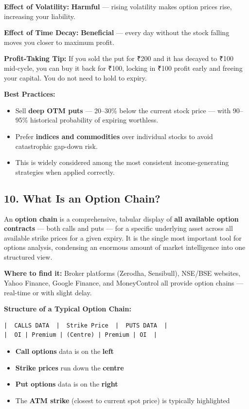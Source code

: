 \documentclass[12pt,openany]{book}
\begin{document}
\textbf{Effect of Volatility:} \textbf{Harmful} — rising volatility makes option prices rise, increasing your liability.

\textbf{Effect of Time Decay:} \textbf{Beneficial} — every day without the stock falling moves you closer to maximum profit.

\textbf{Profit-Taking Tip:} If you sold the put for ₹200 and it has decayed to ₹100 mid-cycle, you can buy it back for ₹100, locking in ₹100 profit early and freeing your capital. You do not need to hold to expiry.

\textbf{Best Practices:}
\begin{itemize}[leftmargin=*]
    \item Sell \textbf{deep OTM puts} — 20–30\% below the current stock price — with 90–95\% historical probability of expiring worthless.
    \item Prefer \textbf{indices and commodities} over individual stocks to avoid catastrophic gap-down risk.
    \item This is widely considered among the most consistent income-generating strategies when applied correctly.
\end{itemize}

\subsection{10. What Is an Option Chain?}

An \textbf{option chain} is a comprehensive, tabular display of \textbf{all available option contracts} — both calls and puts — for a specific underlying asset across all available strike prices for a given expiry. It is the single most important tool for options analysis, condensing an enormous amount of market intelligence into one structured view.

\textbf{Where to find it:} Broker platforms (Zerodha, Sensibull), NSE/BSE websites, Yahoo Finance, Google Finance, and MoneyControl all provide option chains — real-time or with slight delay.

\textbf{Structure of a Typical Option Chain:}

\begin{Verbatim}[breaklines=true,fontsize=\small]
|  CALLS DATA  |  Strike Price  |  PUTS DATA  |
|  OI | Premium | (Centre) | Premium | OI  |
\end{Verbatim}

\begin{itemize}[leftmargin=*]
    \item \textbf{Call options} data is on the \textbf{left}
    \item \textbf{Strike prices} run down the \textbf{centre}
    \item \textbf{Put options} data is on the \textbf{right}
    \item The \textbf{ATM strike} (closest to current spot price) is typically highlighted
\end{itemize}
\end{document}
